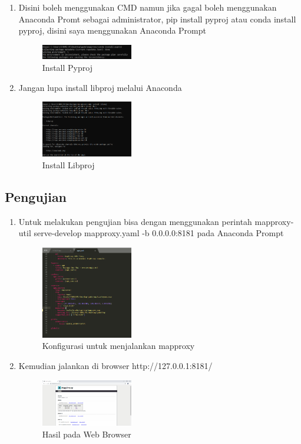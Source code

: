 \begin{enumerate}
    \item Disini boleh menggunakan CMD namun jika gagal boleh menggunakan Anaconda Promt sebagai administrator, pip install pyproj atau conda install pyproj, disini saya menggunakan Anaconda Prompt
    \hfill\break
    \begin{figure}[H]
		\includegraphics[width=4cm]{figures/1174021/5/5.png}
		\centering
		\caption{Install Pyproj}
    \end{figure} 



    \item Jangan lupa install libproj melalui Anaconda
    \hfill\break
    \begin{figure}[H]
        \includegraphics[width=4cm]{figures/1174021/5/6.png}
        \centering
        \caption{Install Libproj}
    \end{figure}

    \end{enumerate}


\subsection{Pengujian}
\begin{enumerate}
    \item Untuk melakukan pengujian bisa dengan menggunakan perintah mapproxy-util serve-develop mapproxy.yaml -b 0.0.0.0:8181 pada Anaconda Prompt
    \hfill\break
    \begin{figure}[H]
		\includegraphics[width=4cm]{figures/1174021/5/7.png}
		\centering
		\caption{Konfigurasi untuk menjalankan mapproxy}
    \end{figure}

    \item Kemudian jalankan di browser http://127.0.0.1:8181/
    \hfill\break
    \begin{figure}[H]
		\includegraphics[width=4cm]{figures/1174021/5/8.png}
		\centering
		\caption{Hasil pada Web Browser}
    \end{figure}

\end{enumerate}


